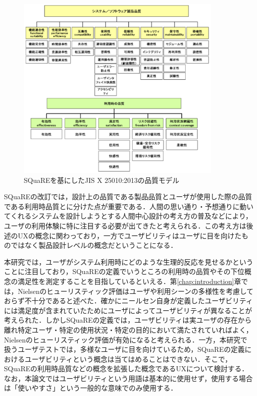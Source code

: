 \begin{figure}[htbp]
  \begin{minipage}{\hsize}
    \begin{center}
       \includegraphics[width=100mm]{img/square.png}
    \end{center}
    \caption{SQuaREを基にしたJIS X 25010:2013の品質モデル}
    \label{fig:square}
  \end{minipage}
\end{figure}

SQuaREの改訂では，設計上の品質である製品品質とユーザが使用した際の品質である利用時品質とに分けた点が重要である．人間の思い通り・予想通りに動いてくれるシステムを設計しようとする人間中心設計\cite{kurosu2013}の考え方の普及などにより，ユーザの利用体験に特に注目する必要が出てきたと考えられる．この考え方は後述のUXの概念に関わっており，一方でユーザビリティはユーザに目を向けたものではなく製品設計レベルの概念だということになる．

本研究では，ユーザがシステム利用時にどのような生理的反応を見せるかということに注目しており，SQuaREの定義でいうところの利用時の品質やその下位概念の満足性を測定することを目指しているといえる．第\ref{chap:introduction}章では，Nielsenのヒューリスティック評価はユーザや利用シーンの多様性を考慮しておらず不十分であると述べた．確かにニールセン自身が定義したユーザビリティには満足度が含まれていたためにユーザによってユーザビリティが異なることが考えられた．しかしSQuaREの定義では，ユーザビリティは実ユーザの存在から離れ特定ユーザ・特定の使用状況・特定の目的において満たされていればよく，Nielsenのヒューリスティック評価が有効になると考えられる．一方，本研究で扱うユーザテストでは，多様なユーザに目を向けているため，SQuaREの定義におけるユーザビリティという概念は当てはめることはできない．そこで，SQuaREの利用時品質などの概念を拡張した概念であるUXについて検討する．なお，本論文ではユーザビリティという用語は基本的に使用せず，使用する場合は「使いやすさ」という一般的な意味でのみ使用する．

